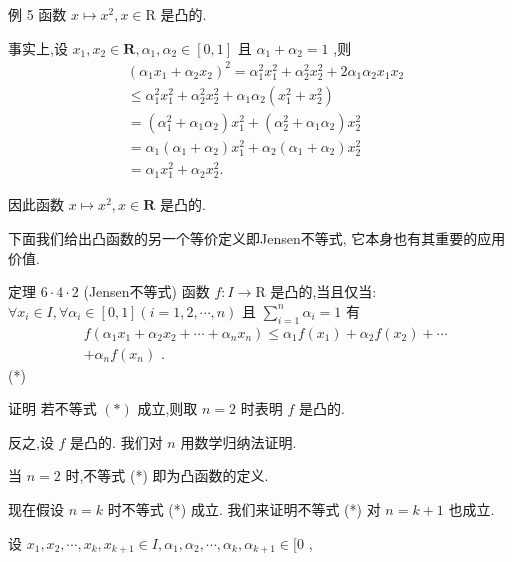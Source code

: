 例 5 函数 $x \mapsto  {x}^{2},x \in  \mathrm{R}$ 是凸的.

事实上,设 ${x}_{1},{x}_{2} \in  \mathbf{R},{\alpha }_{1},{\alpha }_{2} \in  \left\lbrack  {0,1}\right\rbrack$ 且 ${\alpha }_{1} + {\alpha }_{2} = 1$ ,则
\begin{align*}
	&{\left( {\alpha }_{1}{x}_{1} + {\alpha }_{2}{x}_{2}\right) }^{2} = {\alpha }_{1}^{2}{x}_{1}^{2} + {\alpha }_{2}^{2}{x}_{2}^{2} + 2{\alpha }_{1}{\alpha }_{2}{x}_{1}{x}_{2}\\
	&\leq  {\alpha }_{1}^{2}{x}_{1}^{2} + {\alpha }_{2}^{2}{x}_{2}^{2} + {\alpha }_{1}{\alpha }_{2}\left( {{x}_{1}^{2} + {x}_{2}^{2}}\right)\\
	&= \left( {{\alpha }_{1}^{2} + {\alpha }_{1}{\alpha }_{2}}\right) {x}_{1}^{2} + \left( {{\alpha }_{2}^{2} + {\alpha }_{1}{\alpha }_{2}}\right) {x}_{2}^{2}\\
	&= {\alpha }_{1}\left( {{\alpha }_{1} + {\alpha }_{2}}\right) {x}_{1}^{2} + {\alpha }_{2}\left( {{\alpha }_{1} + {\alpha }_{2}}\right) {x}_{2}^{2}\\
	&= {\alpha }_{1}{x}_{1}^{2} + {\alpha }_{2}{x}_{2}^{2}.
\end{align*}

因此函数 $x \mapsto  {x}^{2},x \in  \mathbf{R}$ 是凸的.

下面我们给出凸函数的另一个等价定义即Jensen不等式, 它本身也有其重要的应用价值.

定理 $6 \cdot  4 \cdot  2$ (Jensen不等式) 函数 $f : I \rightarrow  \mathrm{R}$ 是凸的,当且仅当: $\forall {x}_{i} \in  I,\forall {\alpha }_{i} \in  \left\lbrack  {0,1}\right\rbrack  \left( {i = 1,2,\cdots ,n}\right)$ 且 $\mathop{\sum }\limits_{{i = 1}}^{n}{\alpha }_{i} = 1$ 有
\begin{align*}
	&f\left( {{\alpha }_{1}{x}_{1} + {\alpha }_{2}{x}_{2} + \cdots  + {\alpha }_{n}{x}_{n}}\right)  \leq  {\alpha }_{1}f\left( {x}_{1}\right)  + {\alpha }_{2}f\left( {x}_{2}\right)  + \cdots\\
	&+ {\alpha }_{n}f\left( {x}_{n}\right) \text{ . }
\end{align*}
(*)

证明 若不等式 $\left( *\right)$ 成立,则取 $n = 2$ 时表明 $f$ 是凸的.

反之,设 $f$ 是凸的. 我们对 $n$ 用数学归纳法证明.

当 $n = 2$ 时,不等式 (*) 即为凸函数的定义.

现在假设 $n = k$ 时不等式 (*) 成立. 我们来证明不等式 (*) 对 $n = k + 1$ 也成立.

设 ${x}_{1},{x}_{2},\cdots ,{x}_{k},{x}_{k + 1} \in  I,{\alpha }_{1},{\alpha }_{2},\cdots ,{\alpha }_{k},{\alpha }_{k + 1} \in  \lbrack 0$ ,

